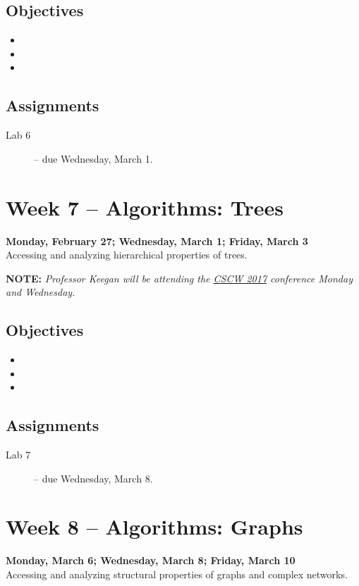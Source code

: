 \documentclass[10pt]{memoir}
\begin{document}
    \subsection{Objectives}
    \begin{itemize}
        \item 
        \item 
        \item 
    \end{itemize}

    \subsection{Assignments}
    \begin{description}%
        \item[Lab 6 ] -- due Wednesday, March 1.
    \end{description}
    
\section{Week 7 -- Algorithms: Trees}
\textcolor{CUGold}{\textbf{Monday, February 27; Wednesday, March 1; Friday, March 3}}\\
Accessing and analyzing hierarchical properties of trees. 

\textbf{NOTE:} \textit{Professor Keegan will be attending the \href{https://cscw.acm.org/2017/}{CSCW 2017} conference Monday and Wednesday.}

    \subsection{Objectives}
    \begin{itemize}
        \item 
        \item 
        \item 
    \end{itemize}

    \subsection{Assignments}
    \begin{description}%
        \item[Lab 7 ] -- due Wednesday, March 8.
    \end{description}
    
\section{Week 8 -- Algorithms: Graphs}
\textcolor{CUGold}{\textbf{Monday, March 6; Wednesday, March 8; Friday, March 10}}\\
Accessing and analyzing structural properties of graphs and complex networks.
\end{document}
